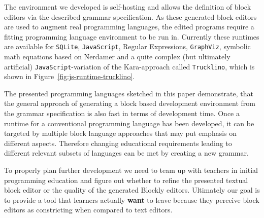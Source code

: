 \documentclass[sigconf,natbib=false]{acmart}
\begin{document}
The environment we developed is self-hosting and allows the definition of block editors via the described grammar specification. As these generated block editors are used to augment real programming languages, the edited programs require a fitting programming language environment to be run in. Currently these runtimes are available for \texttt{SQLite}, \texttt{Java\-Script}, Regular Expressions, \texttt{Graph\-Viz}, symbolic math equations based on Nerdamer and a quite complex (but ultimately artificial) \texttt{Java\-Script}-variation of the Kara-approach called \texttt{Trucklino}\cite{popp_konzeption_2019}, which is shown in Figure~\ref{fig:js-runtime-trucklino}.

The presented programming languages sketched in this paper demonstrate, that the general approach of generating a block based development environment from the grammar specification is also fast in terms of development time. Once a runtime for a conventional programming language has been developed, it can be targeted by multiple block language approaches that may put emphasis on different aspects. Therefore changing educational requirements leading to different relevant subsets of languages can be met by creating a new grammar.

To properly plan further development  we need to team up with teachers in initial programming education and figure out whether to refine the presented textual block editor or the quality of the generated Blockly editors. Ultimately our goal is to provide a tool that learners actually \textbf{want} to leave because they perceive block editors as constricting when compared to text editors.
\printbibliography
\end{document}
